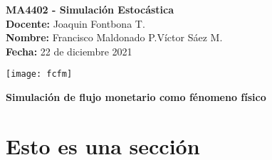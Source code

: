 \documentclass[10pt]{article}
\theoremstyle{plain}
\theoremstyle{definition}
\newcommand{\ramo}{MA4402 - Simulación Estocástica} %
\newcommand{\profe}{Joaquin Fontbona T.}%
\newcommand{\nmbrA}{Francisco Maldonado P.}%
\newcommand{\nmbrB}{Víctor Sáez M.}    %
\newcommand{\nmbrC}{}    %
\newcommand{\fecha}{22 de diciembre 2021}%
\newcommand{\titu}{Simulación de flujo monetario como fénomeno físico } %
\begin{document}
\pagestyle{empty}
\vspace*{-1.2 cm}
\begin{minipage}{0.6\textwidth}
\begin{flushleft}
\hspace*{-0.5cm}\textbf{\ramo}\\
\hspace*{-0.5cm}\textbf{Docente:} \profe\\
\hspace*{-0.5cm}\textbf{Nombre:} \nmbrA\quad \nmbrB\quad \nmbrC
\\
\hspace*{-0.5cm}\textbf{Fecha:} \fecha\\
\smallskip
\end{flushleft}
\end{minipage}
\begin{minipage}{0.36\textwidth}
\begin{flushright}
\texttt{[image: fcfm]}
\end{flushright}
\end{minipage}
\bigskip

\begin{center}
\Huge\textbf{\titu}
\end{center}
\bigskip

\section{Esto es una sección}
\end{document}
